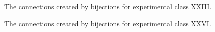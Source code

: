 \begin{figure}[ht!]
    \centering
    
    \caption{The connections created by bijections for experimental class XXIII.}
    \label{fig:expgrp_XXIII}
\end{figure}


\begin{comment}
\begin{figure}[ht!]
    \centering
    
    \caption{The connections created by bijections for experimental class XXIV.}
    \label{fig:expgrp_XXIV}
\end{figure}
\end{comment}


\begin{comment}
\begin{figure}[ht!]
    \centering
    
    \caption{The connections created by bijections for experimental class XXV.}
    \label{fig:expgrp_XXV}
\end{figure}
\end{comment}


\begin{figure}[ht!]
    \centering
    
    \caption{The connections created by bijections for experimental class XXVI.}
    \label{fig:expgrp_XXVI}
\end{figure}